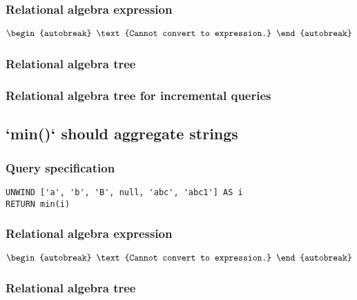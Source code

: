 \subsubsection*{Relational algebra expression}

\begin{align*}
\begin{autobreak}
\text{Cannot convert to expression.}
\end{autobreak}
\end{align*}

\subsubsection*{Relational algebra tree}


\subsubsection*{Relational algebra tree for incremental queries}


\subsection{`min()` should aggregate strings}

\subsubsection*{Query specification}

\begin{lstlisting}
UNWIND ['a', 'b', 'B', null, 'abc', 'abc1'] AS i
RETURN min(i)
\end{lstlisting}

\subsubsection*{Relational algebra expression}

\begin{align*}
\begin{autobreak}
\text{Cannot convert to expression.}
\end{autobreak}
\end{align*}

\subsubsection*{Relational algebra tree}

